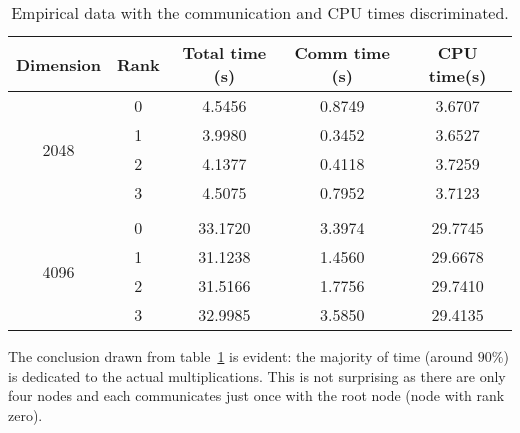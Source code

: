 \begin{table}[H]
\centering
\begin{tabular}{*{5}{c}}
 \toprule
Dimension & Rank  &  Total time (\si{s})  &  Comm time  (\si{s})  &  CPU time(\si{s})  \\ \midrule 
\multirow{4}{*}{2048}
          &  0    &   4.5456              &  0.8749               &   3.6707           \\
          &  1    &   3.9980              &  0.3452               &   3.6527           \\
          &  2    &   4.1377              &  0.4118               &   3.7259           \\
          &  3    &   4.5075              &  0.7952               &   3.7123           \\\\
%
\multirow{4}{*}{4096}
          &  0    &  33.1720              &  3.3974               &  29.7745           \\
          &  1    &  31.1238              &  1.4560               &  29.6678           \\
          &  2    &  31.5166              &  1.7756               &  29.7410           \\
          &  3    &  32.9985              &  3.5850               &  29.4135           \\

\bottomrule
\end{tabular}
\caption{Empirical data with the communication and CPU times discriminated.}
\label{tbl:timing}
\end{table}


The conclusion drawn from table~\ref{tbl:timing} is evident: the majority of time (around $90\%$) is dedicated to the actual multiplications.
This is not surprising as there are only four nodes and each communicates just once with the root node (\ie node with rank zero).
        





